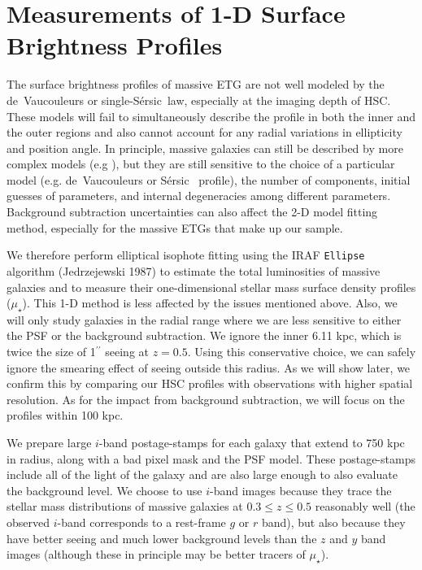 \documentclass[a4paper,fleqn,usenatbib]{mnras}
\def\asec{$^{\prime\prime}$}
\def\ser{{S\'{e}rsic\ }}
\def\mden{{$\mu_{\star}$}}
\begin{document}
\section{Measurements of 1-D Surface Brightness Profiles}
    \label{sec:ellipse}
    
    The surface brightness profiles of massive ETG are not well modeled by the 
    de~Vaucouleurs or single-\ser law, especially at the imaging depth of HSC.
    These models will fail to simultaneously describe the profile in both the inner 
    and the outer regions and also cannot account for any radial variations in 
    ellipticity and position angle. 
    In principle, massive galaxies can still be described by more complex 
    models (e.g \citealt{Huang2013a, Huang2013b, Oh2017}), but they are still 
    sensitive to the choice of a particular model (e.g. de~Vaucouleurs or \ser{} 
    profile), the number of components, initial guesses of parameters, and internal 
    degeneracies among different parameters. 
    Background subtraction uncertainties can also affect the 2-D model fitting method, 
    especially for the massive ETGs that make up our sample. 
    
    We therefore perform elliptical isophote fitting using the IRAF \texttt{Ellipse} 
    algorithm (Jedrzejewski 1987) to estimate the total luminosities of massive 
    galaxies and to measure their one-dimensional stellar mass surface 
    density profiles (\mden{}). 
    This 1-D method is less affected by the issues mentioned above. 
    Also, we will only study galaxies in the radial range where we are less 
    sensitive to either the PSF or the background subtraction.
    We ignore the inner 6.11 kpc, which is twice the size of 1\asec{} seeing at 
    $z=0.5$.
    Using this conservative choice, we can safely ignore the smearing effect of 
    seeing outside this radius.
    As we will show later, we confirm this by comparing our HSC profiles with 
    observations with higher spatial resolution. 
    As for the impact from background subtraction, we will focus on the profiles 
    within 100 kpc. 
        
    We prepare large $i$-band postage-stamps for each galaxy that extend to 750 kpc 
    in radius, along with a bad pixel mask and the PSF model. 
    These postage-stamps include all of the light of the galaxy and are also large 
    enough to also evaluate the background level. We choose to use $i$-band images 
    because they trace the stellar mass distributions of massive galaxies at 
    $0.3 \leq z \leq 0.5$ reasonably well 
    (the observed $i$-band corresponds to a rest-frame $g$ or $r$ band), but also 
    because they have better seeing and much lower background levels than the $z$ 
    and $y$ band images (although these in principle may be better tracers of 
    \mden{}). 
    
\end{document}
